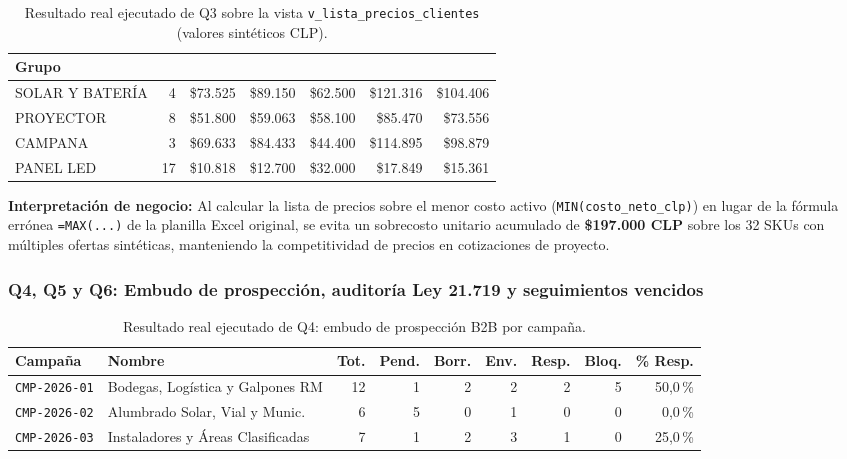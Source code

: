 \documentclass{article}
\begin{document}
\begin{table}[H]
\centering
\scriptsize
\begin{tabularx}{\textwidth}{Lrrrrrr}
\toprule
\textbf{Grupo} & \textbf{} & \textbf{} & \textbf{} & \textbf{} & \textbf{} & \textbf{} \\
\midrule
SOLAR Y BATERÍA & 4 & \$73.525 & \$89.150 & \$62.500 & \$121.316 & \$104.406 \\
PROYECTOR & 8 & \$51.800 & \$59.063 & \$58.100 & \$85.470 & \$73.556 \\
CAMPANA & 3 & \$69.633 & \$84.433 & \$44.400 & \$114.895 & \$98.879 \\
PANEL LED & 17 & \$10.818 & \$12.700 & \$32.000 & \$17.849 & \$15.361 \\
\bottomrule
\end{tabularx}
\caption{Resultado real ejecutado de Q3 sobre la vista \texttt{v\_lista\_precios\_clientes} (valores sintéticos CLP).}
\end{table}

\textbf{Interpretación de negocio:} Al calcular la lista de precios sobre el menor costo activo (\texttt{MIN(costo\_neto\_clp)}) en lugar de la fórmula errónea \texttt{=MAX(...)} de la planilla Excel original, se evita un sobrecosto unitario acumulado de \textbf{\$197.000 CLP} sobre los 32 SKUs con múltiples ofertas sintéticas, manteniendo la competitividad de precios en cotizaciones de proyecto.

\subsubsection*{Q4, Q5 y Q6: Embudo de prospección, auditoría Ley 21.719 y seguimientos vencidos}

\begin{table}[H]
\centering
\scriptsize
\begin{tabularx}{\textwidth}{lLrrrrrrr}
\toprule
\textbf{Campaña} & \textbf{Nombre} & \textbf{Tot.} & \textbf{Pend.} & \textbf{Borr.} & \textbf{Env.} & \textbf{Resp.} & \textbf{Bloq.} & \textbf{\% Resp.} \\
\midrule
\texttt{CMP-2026-01} & Bodegas, Logística y Galpones RM & 12 & 1 & 2 & 2 & 2 & 5 & 50,0\,\% \\
\texttt{CMP-2026-02} & Alumbrado Solar, Vial y Munic. & 6 & 5 & 0 & 1 & 0 & 0 & 0,0\,\% \\
\texttt{CMP-2026-03} & Instaladores y Áreas Clasificadas & 7 & 1 & 2 & 3 & 1 & 0 & 25,0\,\% \\
\bottomrule
\end{tabularx}
\caption{Resultado real ejecutado de Q4: embudo de prospección B2B por campaña.}
\end{table}
\end{document}
